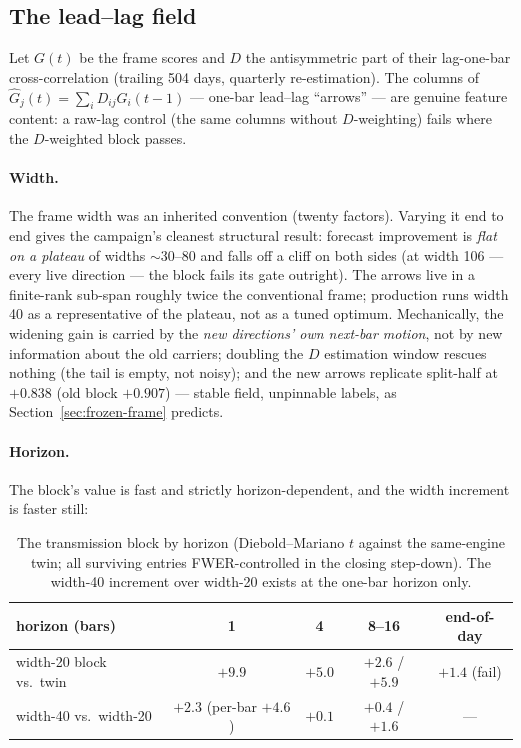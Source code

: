 \subsection{The lead--lag field}
\label{sec:transmission}

Let $G(t)$ be the frame scores and $D$ the antisymmetric part of their
lag-one-bar cross-correlation (trailing 504 days, quarterly re-estimation).
The columns of $\hat G_j(t) = \sum_i D_{ij} G_i(t-1)$ --- one-bar lead--lag
``arrows'' --- are genuine feature content: a raw-lag control (the same
columns without $D$-weighting) fails where the $D$-weighted block passes.

\paragraph{Width.} The frame width was an inherited convention (twenty
factors). Varying it end to end gives the campaign's cleanest structural
result: forecast improvement is \emph{flat on a plateau} of widths
$\sim$30--80 and falls off a cliff on both sides (at width 106 --- every live
direction --- the block fails its gate outright). The arrows live in a
finite-rank sub-span roughly twice the conventional frame; production runs
width 40 as a representative of the plateau, not as a tuned optimum.
Mechanically, the widening gain is carried by the \emph{new directions' own
next-bar motion}, not by new information about the old carriers; doubling the
$D$ estimation window rescues nothing (the tail is empty, not noisy); and the
new arrows replicate split-half at $+0.838$ (old block $+0.907$) --- stable
field, unpinnable labels, as Section~\ref{sec:frozen-frame} predicts.

\paragraph{Horizon.} The block's value is fast and strictly
horizon-dependent, and the width increment is faster still:

\begin{table}[H]
\centering
\caption{The transmission block by horizon (Diebold--Mariano $t$ against the
same-engine twin; all surviving entries FWER-controlled in the closing
step-down). The width-40 increment over width-20 exists at the one-bar
horizon only.}
\label{tab:transmission-horizon}
\small
\begin{tabular}{lcccc}
\toprule
horizon (bars) & 1 & 4 & 8--16 & end-of-day \\
\midrule
width-20 block vs.\ twin & $+9.9$ & $+5.0$ & $+2.6$ / $+5.9$ & $+1.4$ (fail) \\
width-40 vs.\ width-20 & $+2.3$ (per-bar $+4.6$) & $+0.1$ & $+0.4$ / $+1.6$ & --- \\
\bottomrule
\end{tabular}
\end{table}

